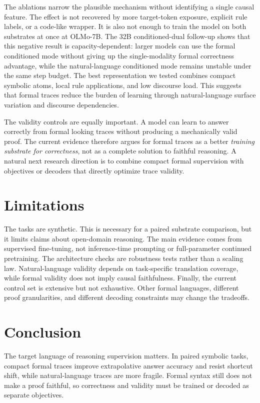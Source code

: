 \documentclass[11pt]{article}
\begin{document}
The ablations narrow the plausible mechanism without identifying a single
causal feature. The effect is not recovered by more target-token exposure,
explicit rule labels, or a code-like wrapper. It is also not enough to train the
model on both substrates at once at OLMo-7B. The 32B conditioned-dual follow-up
shows that this negative result is capacity-dependent: larger models can use the
formal conditioned mode without giving up the single-modality formal
correctness advantage, while the natural-language conditioned mode remains
unstable under the same step budget. The best representation we tested combines
compact
symbolic atoms, local rule applications, and low discourse load. This suggests
that formal traces reduce the burden of learning through natural-language
surface variation and discourse dependencies.

The validity controls are equally important. A model can learn to answer
correctly from formal looking traces without producing a mechanically valid
proof. The current evidence therefore argues for formal traces as a better
\emph{training substrate for correctness}, not as a complete solution to
faithful reasoning. A natural next research direction is to combine compact
formal supervision with objectives or decoders that directly optimize trace
validity.

\section{Limitations}

The tasks are synthetic. This is necessary for a paired substrate comparison,
but it limits claims about open-domain reasoning. The main evidence comes from
supervised fine-tuning, not inference-time prompting or full-parameter
continued pretraining. The architecture checks are robustness tests rather than
a scaling law. Natural-language validity depends on task-specific translation
coverage, while formal validity does not imply causal faithfulness. Finally, the
current control set is extensive but not exhaustive. Other formal languages,
different proof granularities, and different decoding constraints may change the
tradeoffs.

\section{Conclusion}

The target language of reasoning supervision matters. In paired symbolic tasks,
compact formal traces improve extrapolative answer accuracy and resist shortcut
shift, while natural-language traces are more fragile. Formal syntax still does
not make a proof faithful, so correctness and validity must be trained or
decoded as separate objectives.
\end{document}
